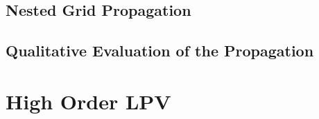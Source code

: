 \subsection{Nested Grid Propagation}
\subsection{Qualitative Evaluation of the Propagation}
\section{High Order LPV}
%





























